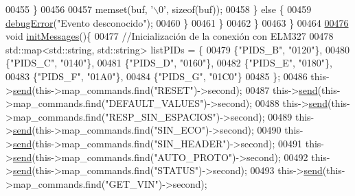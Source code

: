 \begin{DoxyCode}
{{{{{{{{{{{{{00455                     \}
00456 
00457                     memset(buf, \textcolor{charliteral}{'\(\backslash\)0'}, \textcolor{keyword}{sizeof}(buf));
00458                 \} \textcolor{keywordflow}{else} \{
00459                     \hyperlink{debug_8hpp_a06cd512b8b15b6da31a5a557445f7027}{debugError}(\textcolor{stringliteral}{"Evento desconocido"});
00460                 \}
00461             \}
00462         \}
00463     \}
00464 
\hyperlink{classObd_a5091314ed8068800cce40e7a74a3731e}{00476}     \textcolor{keywordtype}{void} \hyperlink{classObd_a5091314ed8068800cce40e7a74a3731e}{initMessages}()\{
00477         \textcolor{comment}{//Inicialización de la conexión con ELM327}
00478         std::map<std::string, std::string> listPIDs = \{
00479             \{\textcolor{stringliteral}{"PIDS\_B"}, \textcolor{stringliteral}{"0120"}\},
00480             \{\textcolor{stringliteral}{"PIDS\_C"}, \textcolor{stringliteral}{"0140"}\},
00481             \{\textcolor{stringliteral}{"PIDS\_D"}, \textcolor{stringliteral}{"0160"}\},
00482             \{\textcolor{stringliteral}{"PIDS\_E"}, \textcolor{stringliteral}{"0180"}\},
00483             \{\textcolor{stringliteral}{"PIDS\_F"}, \textcolor{stringliteral}{"01A0"}\},
00484             \{\textcolor{stringliteral}{"PIDS\_G"}, \textcolor{stringliteral}{"01C0"}\}
00485         \};
00486         this->\hyperlink{classObd_a453591bc9a280e8d44d82025ce8590e9}{send}(this->map\_commands.find(\textcolor{stringliteral}{"RESET"})->second);
00487         this->\hyperlink{classObd_a453591bc9a280e8d44d82025ce8590e9}{send}(this->map\_commands.find(\textcolor{stringliteral}{"DEFAULT\_VALUES"})->second);
00488         this->\hyperlink{classObd_a453591bc9a280e8d44d82025ce8590e9}{send}(this->map\_commands.find(\textcolor{stringliteral}{"RESP\_SIN\_ESPACIOS"})->second);                   
00489         this->\hyperlink{classObd_a453591bc9a280e8d44d82025ce8590e9}{send}(this->map\_commands.find(\textcolor{stringliteral}{"SIN\_ECO"})->second);
00490         this->\hyperlink{classObd_a453591bc9a280e8d44d82025ce8590e9}{send}(this->map\_commands.find(\textcolor{stringliteral}{"SIN\_HEADER"})->second);                  
00491         this->\hyperlink{classObd_a453591bc9a280e8d44d82025ce8590e9}{send}(this->map\_commands.find(\textcolor{stringliteral}{"AUTO\_PROTO"})->second);
00492         this->\hyperlink{classObd_a453591bc9a280e8d44d82025ce8590e9}{send}(this->map\_commands.find(\textcolor{stringliteral}{"STATUS"})->second);
00493         this->\hyperlink{classObd_a453591bc9a280e8d44d82025ce8590e9}{send}(this->map\_commands.find(\textcolor{stringliteral}{"GET\_VIN"})->second);
}}}}}}}}}}}}}
\end{DoxyCode}

